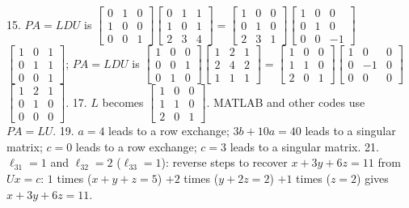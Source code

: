 15. \(PA=LDU\) is \(\begin{bmatrix}0&1&0\\ 1&0&0\\ 0&0&1\end{bmatrix}\)\(\begin{bmatrix}0&1&1\\ 1&0&1\\ 2&3&4\end{bmatrix}=\begin{bmatrix}1&0&0\\ 0&1&0\\ 2&3&1\end{bmatrix}\)\(\begin{bmatrix}1&0&0\\ 0&1&0\\ 0&0&-1\end{bmatrix}\)\(\begin{bmatrix}1&0&1\\ 0&1&1\\ 0&0&1\end{bmatrix}\); \(PA=LDU\) is \(\begin{bmatrix}1&0&0\\ 0&0&1\\ 0&1&0\end{bmatrix}\)\(\begin{bmatrix}1&2&1\\ 2&4&2\\ 1&1&1\end{bmatrix}=\begin{bmatrix}1&0&0\\ 1&1&0\\ 2&0&1\end{bmatrix}\)\(\begin{bmatrix}1&0&0\\ 0&-1&0\\ 0&0&0\end{bmatrix}\)\(\begin{bmatrix}1&2&1\\ 0&1&0\\ 0&0&0\end{bmatrix}\).
17. \(L\) becomes \(\begin{bmatrix}1&0&0\\ 1&1&0\\ 2&0&1\end{bmatrix}\). MATLAB and other codes use \(PA=LU\).
19. \(a=4\) leads to a row exchange; \(3b+10a=40\) leads to a singular matrix; \(c=0\) leads to a row exchange; \(c=3\) leads to a singular matrix.
21. \(\ell_{31}=1\) and \(\ell_{32}=2\) (\(\ell_{33}=1\)): reverse steps to recover \(x+3y+6z=11\) from \(Ux=c\): \(1\) times (\(x+y+z=5\)) \(+2\) times (\(y+2z=2\)) \(+1\) times (\(z=2\)) gives \(x+3y+6z=11\).

